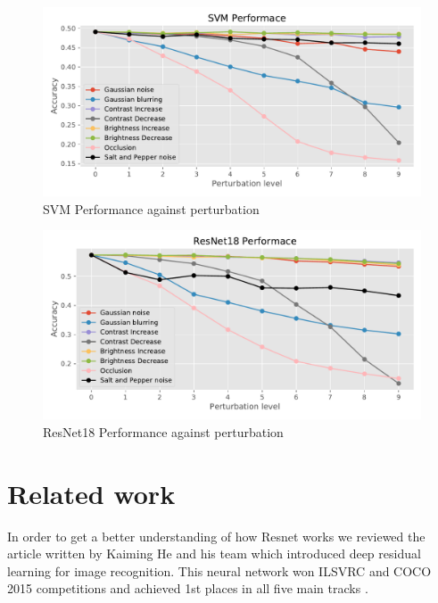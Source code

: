 \documentclass{article}
\begin{document}
\begin{itemize}
    \begin{figure}[H]
    \centering
    \includegraphics[width=\columnwidth]{figures/SVM_Performance.pdf}
    \caption{SVM Performance against perturbation}
    \label{fig:sp}
    \end{figure}        
    
    \begin{figure}[H]
    \centering
    \includegraphics[width=\columnwidth]{figures/ResNet18_Performance.pdf}
    \caption{ResNet18 Performance against perturbation}
    \label{fig:rp}
    \end{figure}    

\end{itemize}


\section{Related work}
\label{sec:relwork}

In order to get a better understanding of how Resnet works we reviewed the article written by Kaiming He and his team which introduced deep residual learning for image recognition. This neural network won ILSVRC and COCO 2015 competitions and achieved 1st places in all five main tracks \citep{ImageNet}.
\end{document}
